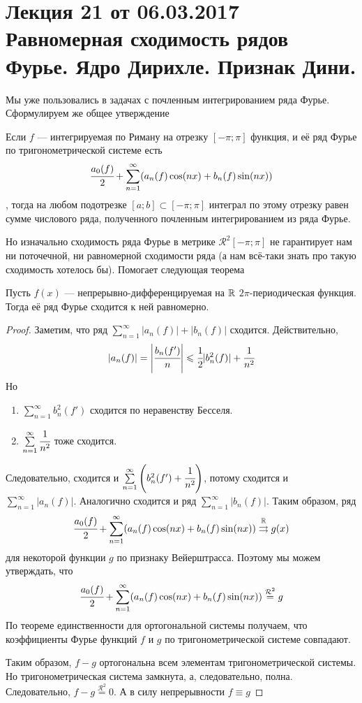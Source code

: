 \pagestyle{fancy}
\section{Лекция 21 от 06.03.2017 \\ Равномерная сходимость рядов Фурье. Ядро Дирихле. Признак Дини.}
Мы уже пользовались в задачах с почленным интегрированием ряда Фурье. Сформулируем же общее утверждение
\begin{Statement}
	Если $f$ --- интегрируемая по Риману на отрезку $[-\pi;\pi]$  функция, и её ряд Фурье по тригонометрической системе есть
	$$
		\cfrac{a_0(f)}{2} + \sum\limits_{n=1}^{\infty}(a_n(f)\cos(nx) + b_n(f)\sin(nx))
	$$
	, тогда на любом подотрезке $[a;b] \subset [-\pi; \pi]$ интеграл по этому отрезку равен сумме числового ряда, полученного почленным интегрированием из ряда Фурье.
\end{Statement}
Но изначально сходимость ряда Фурье в метрике $\mathcal{R}^2[-\pi; \pi]$ не гарантирует нам ни поточечной, ни равномерной сходимости ряда (а нам всё-таки знать про такую сходимость хотелось бы). Помогает следующая теорема
\begin{Theorem}
	Пусть $f(x)$ --- непрерывно-дифференцируемая на $\mathbb{R}$ $2\pi$-периодическая функция. Тогда её ряд Фурье сходится к ней равномерно.
\end{Theorem}
\begin{proof}
	Заметим, что ряд $\sum\limits_{n=1}^{\infty} |a_n(f)| + |b_n(f)|$ сходится. Действительно,
	$$
		|a_n(f)| = \left|\cfrac{b_n(f')}{n}\right| \leqslant \cfrac{1}{2} |b_n^2(f)| + \cfrac{1}{n^2}
	$$
	Но
	\begin{enumerate}
		\item $\sum\limits_{n=1}^{\infty} b_n^2(f')$ сходится по неравенству Бесселя.
		\item $\sum\limits_{n=1}^{\infty} \cfrac{1}{n^2}$ тоже сходится.
	\end{enumerate}
	Следовательно, сходится и $\sum\limits_{n=1}^{\infty}\left(b_n^2(f') + \cfrac{1}{n^2}\right)$, потому сходится и $\sum \limits_{n=1}^{\infty}|a_n(f)|$. Аналогично сходится и ряд $\sum \limits_{n=1}^{\infty}|b_n(f)|$. Таким образом, ряд 
	$$
		\cfrac{a_0(f)}{2} + \sum\limits_{n=1}^{\infty}(a_n(f)\cos(nx)+ b_n(f)\sin(nx)) \overset{\mathbb{R}}{\rightrightarrows} g(x)
	$$
	для некоторой функции $g$ по признаку Вейерштрасса. Поэтому мы можем утверждать, что
	$$
		\cfrac{a_0(f)}{2} + \sum\limits_{n=1}^{\infty}(a_n(f)\cos(nx)+ b_n(f)\sin(nx)) \overset{\mathcal{R}^2}{=} g
	$$
	По теореме единственности для ортогональной системы получаем, что коэффициенты Фурье функций $f$ и $g$ по тригонометрической системе совпадают.
	\par Таким образом, $f-g$ ортогональна всем элементам тригонометрической системы. Но тригонометрическая система замкнута, а, следовательно, полна. Следовательно, $f-g \overset{\mathcal{R}^2}{=} 0$. А в силу непрерывности $f \equiv g$
\end{proof}
